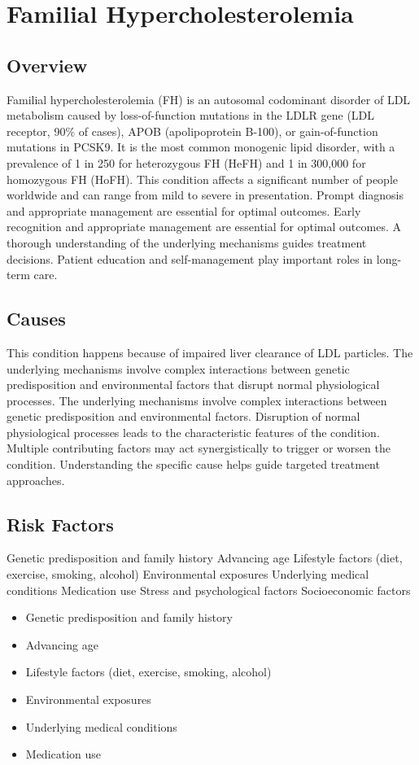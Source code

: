 \chapter{Familial Hypercholesterolemia}
\label{sec:Familial Hypercholesterolemia}

\section{Overview}
Familial hypercholesterolemia (FH) is an autosomal codominant disorder of LDL metabolism caused by loss-of-function mutations in the LDLR gene (LDL receptor, 90\% of cases), APOB (apolipoprotein B-100), or gain-of-function mutations in PCSK9. It is the most common monogenic lipid disorder, with a prevalence of 1 in 250 for heterozygous FH (HeFH) and 1 in 300,000 for homozygous FH (HoFH). This condition affects a significant number of people worldwide and can range from mild to severe in presentation. Prompt diagnosis and appropriate management are essential for optimal outcomes. Early recognition and appropriate management are essential for optimal outcomes. A thorough understanding of the underlying mechanisms guides treatment decisions. Patient education and self-management play important roles in long-term care.
\section{Causes}
This condition happens because of impaired liver clearance of LDL particles. The underlying mechanisms involve complex interactions between genetic predisposition and environmental factors that disrupt normal physiological processes. The underlying mechanisms involve complex interactions between genetic predisposition and environmental factors. Disruption of normal physiological processes leads to the characteristic features of the condition. Multiple contributing factors may act synergistically to trigger or worsen the condition. Understanding the specific cause helps guide targeted treatment approaches.
\section{Risk Factors}
Genetic predisposition and family history Advancing age Lifestyle factors (diet, exercise, smoking, alcohol) Environmental exposures Underlying medical conditions Medication use Stress and psychological factors Socioeconomic factors

\begin{itemize}[noitemsep]
  \item Genetic predisposition and family history
  \item Advancing age
  \item Lifestyle factors (diet, exercise, smoking, alcohol)
  \item Environmental exposures
  \item Underlying medical conditions
  \item Medication use
\end{itemize}
